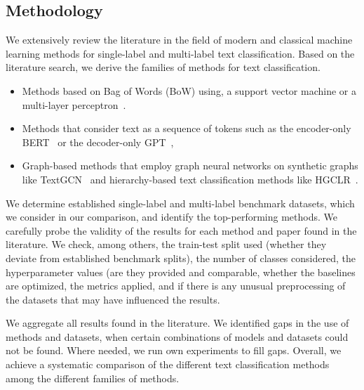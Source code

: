 \subsection{Methodology}

We extensively review the literature in the field of modern and classical machine learning methods for single-label and multi-label text classification.
Based on the literature search, we derive the families of methods for text classification. 

\begin{itemize}
\item Methods based on Bag of Words (BoW) using, \eg a support vector machine or a multi-layer perceptron~\cite{galkescherp-acl2022}.

\item Methods that consider text as a sequence of tokens such as the encoder-only BERT~\cite{DBLP:conf/naacl/DevlinCLT19} or the decoder-only GPT~\cite{DBLP:conf/nips/BrownMRSKDNSSAA20}, 

\item Graph-based methods that employ graph neural networks on synthetic graphs like TextGCN~\cite{DBLP:conf/aaai/YaoM019} and hierarchy-based text classification methods like HGCLR~\cite{DBLP:conf/acl/WangWH0W22}.
\end{itemize}

We determine established single-label and multi-label benchmark datasets, which we consider in our comparison, and identify the top-performing methods.
We carefully probe the validity of the results for each method and paper found in the literature.
We check, among others, the train-test split used (whether they deviate from established benchmark splits), 
the number of classes considered, 
the hyperparameter values (are they provided and comparable, 
whether the baselines are optimized, 
the metrics applied, 
and if there is any unusual preprocessing of the datasets that may have influenced the results.  

We aggregate all results found in the literature.
We identified gaps in the use of methods and datasets, \ie when certain combinations of models and datasets could not be found.
Where needed, we run own experiments to fill gaps.
Overall, we achieve a systematic comparison of the different text classification methods among the different families of methods.

